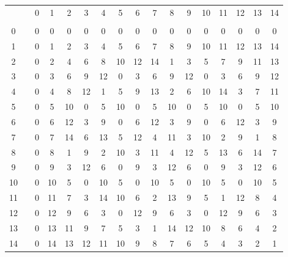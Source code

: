 \begin{footnotesize}
\begin{tabular}
    {c@{ }c@{ }c@{ }c@{ }c@{ }c@{ }c@{ }c@{ }c@{ }c@{ }c@{ }c@{ }c@{ }c@{ }c@{ }c@{ }c}
        & \phantom{X}
             &  0 &  1 &  2 &  3 &  4 &  5 &  6 &  7 &  8 &  9 & 10 & 11 & 12 & 13 & 14 \\
        &    &    &    &    &    &    &    &    &    &    &    &    &    &    &    &    \\
    0   &    &  0 &  0 &  0 &  0 &  0 &  0 &  0 &  0 &  0 &  0 &  0 &  0 &  0 &  0 &  0 \\
    1   &    &  0 &  1 &  2 &  3 &  4 &  5 &  6 &  7 &  8 &  9 & 10 & 11 & 12 & 13 & 14 \\
    2   &    &  0 &  2 &  4 &  6 &  8 & 10 & 12 & 14 &  1 &  3 &  5 &  7 &  9 & 11 & 13 \\
    3   &    &  0 &  3 &  6 &  9 & 12 &  0 &  3 &  6 &  9 & 12 &  0 &  3 &  6 &  9 & 12 \\
    4   &    &  0 &  4 &  8 & 12 &  1 &  5 &  9 & 13 &  2 &  6 & 10 & 14 &  3 &  7 & 11 \\
    5   &    &  0 &  5 & 10 &  0 &  5 & 10 &  0 &  5 & 10 &  0 &  5 & 10 &  0 &  5 & 10 \\
    6   &    &  0 &  6 & 12 &  3 &  9 &  0 &  6 & 12 &  3 &  9 &  0 &  6 & 12 &  3 &  9 \\
    7   &    &  0 &  7 & 14 &  6 & 13 &  5 & 12 &  4 & 11 &  3 & 10 &  2 &  9 &  1 &  8 \\
    8   &    &  0 &  8 &  1 &  9 &  2 & 10 &  3 & 11 &  4 & 12 &  5 & 13 &  6 & 14 &  7 \\
    9   &    &  0 &  9 &  3 & 12 &  6 &  0 &  9 &  3 & 12 &  6 &  0 &  9 &  3 & 12 &  6 \\
   10   &    &  0 & 10 &  5 &  0 & 10 &  5 &  0 & 10 &  5 &  0 & 10 &  5 &  0 & 10 &  5 \\
   11   &    &  0 & 11 &  7 &  3 & 14 & 10 &  6 &  2 & 13 &  9 &  5 &  1 & 12 &  8 &  4 \\
   12   &    &  0 & 12 &  9 &  6 &  3 &  0 & 12 &  9 &  6 &  3 &  0 & 12 &  9 &  6 &  3 \\
   13   &    &  0 & 13 & 11 &  9 &  7 &  5 &  3 &  1 & 14 & 12 & 10 &  8 &  6 &  4 &  2 \\
   14   &    &  0 & 14 & 13 & 12 & 11 & 10 &  9 &  8 &  7 &  6 &  5 &  4 &  3 &  2 &  1 \\
\end{tabular}
\end{footnotesize}
